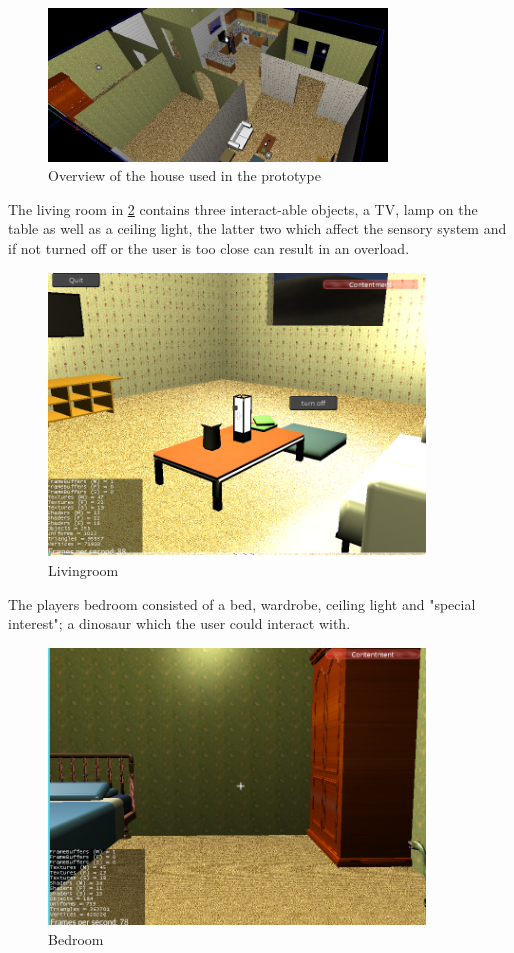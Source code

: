 \documentclass[11pt]{report}
\begin{document}
\begin{figure}[H]
\centering
\includegraphics[width=90mm]{images/prototype/old_fullhouse.jpg}
\caption{Overview of the house used in the prototype}
\label{old_house}
\end{figure}

The living room in \ref{prototype_livingroom} contains three interact-able objects, a TV, lamp on the table as well as a ceiling light, the latter two which affect the sensory system and if not turned off or the user is too close can result in an overload. 

\begin{figure}[H]
\centering
\includegraphics[width=100mm]{images/prototype/livingroom.png}
\caption{Livingroom}
\label{prototype_livingroom}
\end{figure}

The players bedroom consisted of a bed, wardrobe, ceiling light and "special interest"; a dinosaur which the user could interact with.

\begin{figure}[H]
\centering
\includegraphics[width=100mm]{images/prototype/bedroom.png}
\caption{Bedroom}
\label{prototype_bedroom}
\end{figure}
\end{document}
